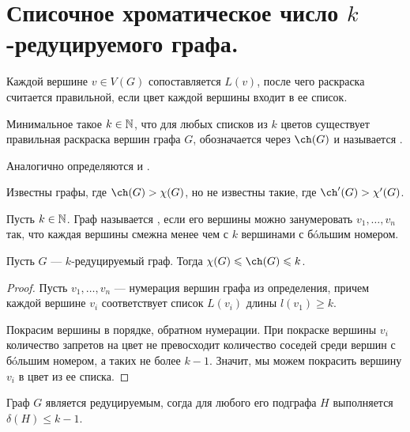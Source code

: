 \section{Списочное хроматическое число $k$-редуцируемого графа.}

\begin{definition}
	Каждой вершине $v \in V(G)$ сопоставляется  $L(v)$, после чего раскраска считается правильной, если цвет каждой вершины входит в ее список.

	Минимальное такое  $k \in \mathbb{N}$, что для любых списков из $k$ цветов существует правильная раскраска вершин графа $G$, обозначается через $\ch(G)$  и называется .

	Аналогично определяются  и .
\end{definition}
\begin{note}
	Известны графы, где $\ch(G) > \chi(G)$, но не известны такие, где $\ch'(G) > \chi'(G)$.
\end{note}
 \begin{definition}
    Пусть $k \in \mathbb{N}$. Граф называется , если его вершины можно занумеровать $v_1, \ldots , v_n $ так, что каждая вершины смежна менее чем с $k$ вершинами с б\'oльшим номером.
\end{definition}
\begin{lemma}\label{lm:coloring_3}
	Пусть $G$ --- $k$-редуцируемый граф. Тогда $\chi(G) \le \ch(G) \le k$.
\end{lemma}
\begin{proof}
    Пусть $v_1, \ldots , v_n $ --- нумерация вершин графа из определения, причем каждой вершине $v_i$ соответствует список $L(v_i)$ длины $l(v_1) \ge k$.

	Покрасим вершины в порядке, обратном нумерации. При покраске вершины $v_i$ количество запретов на цвет не превосходит количество соседей среди вершин с б\'oльшим номером, а таких не более $k-1$. Значит, мы можем покрасить вершину $v_i$ в цвет из ее списка.
\end{proof}
\begin{lemma}\label{lm:coloring_4}
    Граф $G$ является редуцируемым, согда для любого его подграфа $H$ выполняется $\delta(H) \le k-1$.
\end{lemma}
